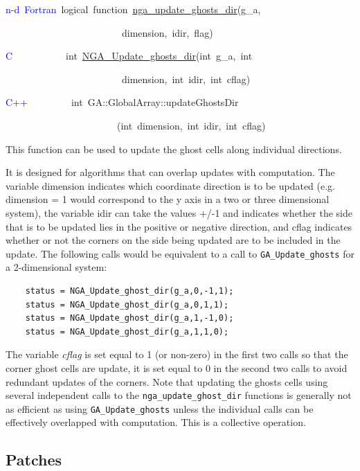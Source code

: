 \textcolor{blue}{n-d~Fortran}~logical~function~\href{https://hpc.pnl.gov/globalarrays/api/f_op_api.html\#ga_update_ghost_dir}{nga\_{}update\_{}ghosts\_{}dir}(g\_a,~

~~~~~~~~~~~~~~~~~~~~~~~~dimension,~idir,~flag)~

\textcolor{blue}{C}~~~~~~~~~~~int~\href{https://hpc.pnl.gov/globalarrays/api/c_op_api.html\#nga_update_ghost_dir}{NGA\_{}Update\_{}ghosts\_{}dir}(int~g\_a,~int~

~~~~~~~~~~~~~~~~~~~~~~~~dimension,~int~idir,~int~cflag)~

\textcolor{blue}{C++}~~~~~~~~~int~GA::GlobalArray::updateGhostsDir

~~~~~~~~~~~~~~~~~~~~~~~(int~dimension,~int~idir,~int~cflag)~

This function can be used to update the ghost cells along individual
directions.

It is designed for algorithms that can overlap updates with computation.
The variable dimension indicates which coordinate direction is to
be updated (e.g. dimension = 1 would correspond to the y axis in a
two or three dimensional system), the variable idir can take the values
+/-1 and indicates whether the side that is to be updated lies in
the positive or negative direction, and cflag indicates whether or
not the corners on the side being updated are to be included in the
update. The following calls would be equivalent to a call to \texttt{GA\_Update\_ghosts}
for a 2-dimensional system:
\begin{verbatim}
    status = NGA_Update_ghost_dir(g_a,0,-1,1);
    status = NGA_Update_ghost_dir(g_a,0,1,1);
    status = NGA_Update_ghost_dir(g_a,1,-1,0);
    status = NGA_Update_ghost_dir(g_a,1,1,0);
\end{verbatim}
The variable \emph{cflag} is set equal to 1 (or non-zero) in the first
two calls so that the corner ghost cells are update, it is set equal
to 0 in the second two calls to avoid redundant updates of the corners.
Note that updating the ghosts cells using several independent calls
to the \texttt{nga\_update\_ghost\_dir} functions is generally not
as efficient as using \texttt{GA\_Update\_ghosts} unless the individual
calls can be effectively overlapped with computation. This is a collective
operation. 


\subsection{Patches }

